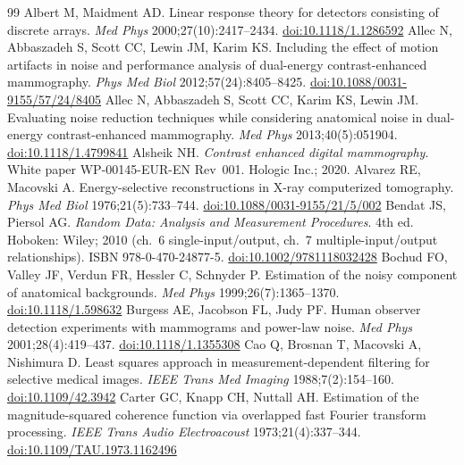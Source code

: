 \documentclass[11pt,a4paper]{article}
\begin{document}
\begin{thebibliography}{99}\small
{} Albert M, Maidment AD. Linear response theory for detectors consisting of discrete arrays. \emph{Med Phys} 2000;27(10):2417--2434. \href{https://doi.org/10.1118/1.1286592}{doi:10.1118/1.1286592}
 Allec N, Abbaszadeh S, Scott CC, Lewin JM, Karim KS. Including the effect of motion artifacts in noise and performance analysis of dual-energy contrast-enhanced mammography. \emph{Phys Med Biol} 2012;57(24):8405--8425. \href{https://doi.org/10.1088/0031-9155/57/24/8405}{doi:10.1088/0031-9155/57/24/8405}
 Allec N, Abbaszadeh S, Scott CC, Karim KS, Lewin JM. Evaluating noise reduction techniques while considering anatomical noise in dual-energy contrast-enhanced mammography. \emph{Med Phys} 2013;40(5):051904. \href{https://doi.org/10.1118/1.4799841}{doi:10.1118/1.4799841}
 Alsheik NH. \emph{Contrast enhanced digital mammography}. White paper WP-00145-EUR-EN Rev~001. Hologic Inc.; 2020.
 Alvarez RE, Macovski A. Energy-selective reconstructions in X-ray computerized tomography. \emph{Phys Med Biol} 1976;21(5):733--744. \href{https://doi.org/10.1088/0031-9155/21/5/002}{doi:10.1088/0031-9155/21/5/002}
 Bendat JS, Piersol AG. \emph{Random Data: Analysis and Measurement Procedures}. 4th ed. Hoboken: Wiley; 2010 (ch.~6 single-input/output, ch.~7 multiple-input/output relationships). ISBN 978-0-470-24877-5. \href{https://doi.org/10.1002/9781118032428}{doi:10.1002/9781118032428}
 Bochud FO, Valley JF, Verdun FR, Hessler C, Schnyder P. Estimation of the noisy component of anatomical backgrounds. \emph{Med Phys} 1999;26(7):1365--1370. \href{https://doi.org/10.1118/1.598632}{doi:10.1118/1.598632}
 Burgess AE, Jacobson FL, Judy PF. Human observer detection experiments with mammograms and power-law noise. \emph{Med Phys} 2001;28(4):419--437. \href{https://doi.org/10.1118/1.1355308}{doi:10.1118/1.1355308}
 Cao Q, Brosnan T, Macovski A, Nishimura D. Least squares approach in measurement-dependent filtering for selective medical images. \emph{IEEE Trans Med Imaging} 1988;7(2):154--160. \href{https://doi.org/10.1109/42.3942}{doi:10.1109/42.3942}
 Carter GC, Knapp CH, Nuttall AH. Estimation of the magnitude-squared coherence function via overlapped fast Fourier transform processing. \emph{IEEE Trans Audio Electroacoust} 1973;21(4):337--344. \href{https://doi.org/10.1109/TAU.1973.1162496}{doi:10.1109/TAU.1973.1162496}

\end{thebibliography}
\end{document}
